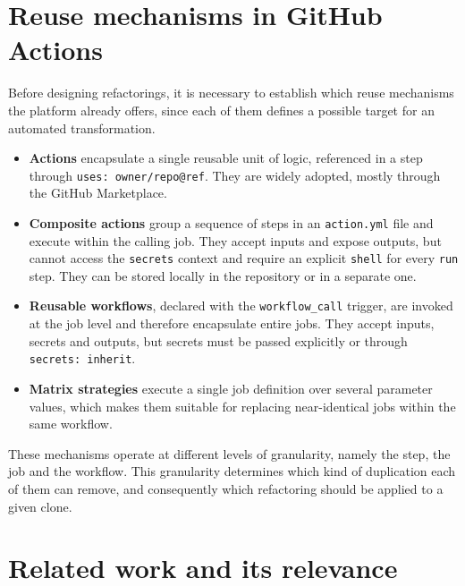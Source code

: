 \documentclass[a4paper,11pt,notitlepage]{report}
\begin{document}
\chapter{Reuse mechanisms in GitHub Actions} \label{ch_reuse}

Before designing refactorings, it is necessary to establish which reuse mechanisms the
platform already offers, since each of them defines a possible target for an automated
transformation.

\begin{itemize}
  \item \textbf{Actions} encapsulate a single reusable unit of logic, referenced in a step
    through \texttt{uses:\ owner/repo@ref}. They are widely adopted, mostly through the
    GitHub Marketplace.
  \item \textbf{Composite actions} group a sequence of steps in an \texttt{action.yml} file
    and execute within the calling job. They accept inputs and expose outputs, but cannot
    access the \texttt{secrets} context and require an explicit \texttt{shell} for every
    \texttt{run} step. They can be stored locally in the repository or in a separate one.
  \item \textbf{Reusable workflows}, declared with the \texttt{workflow\_call} trigger, are
    invoked at the job level and therefore encapsulate entire jobs. They accept inputs,
    secrets and outputs, but secrets must be passed explicitly or through
    \texttt{secrets:\ inherit}.
  \item \textbf{Matrix strategies} execute a single job definition over several parameter
    values, which makes them suitable for replacing near-identical jobs within the same
    workflow.
\end{itemize}

These mechanisms operate at different levels of granularity, namely the step, the job and
the workflow. This granularity determines which kind of duplication each of them can
remove, and consequently which refactoring should be applied to a given clone.

\chapter{Related work and its relevance} \label{ch_related}
\end{document}
